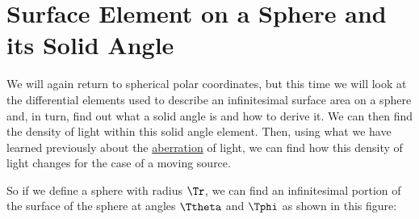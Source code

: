 \section{Surface Element on a Sphere and its Solid Angle} \label{subsect: Surface Element on a Sphere}

We will again return to spherical polar coordinates, but this time we will look at the differential elements used to describe an infinitesimal surface area on a sphere and, in turn, find out what a solid angle is and how to derive it.
We can then find the density of light within this solid angle element.
Then, using what we have learned previously about the \hyperlink{def-aberration}{aberration} of light, we can find how this density of light changes for the case of a moving source.

So if we define a sphere with radius $\Tr $, we can find an infinitesimal portion of the surface of the sphere at angles ${\Ttheta }$ and ${\Tphi }$ as shown in this figure:

